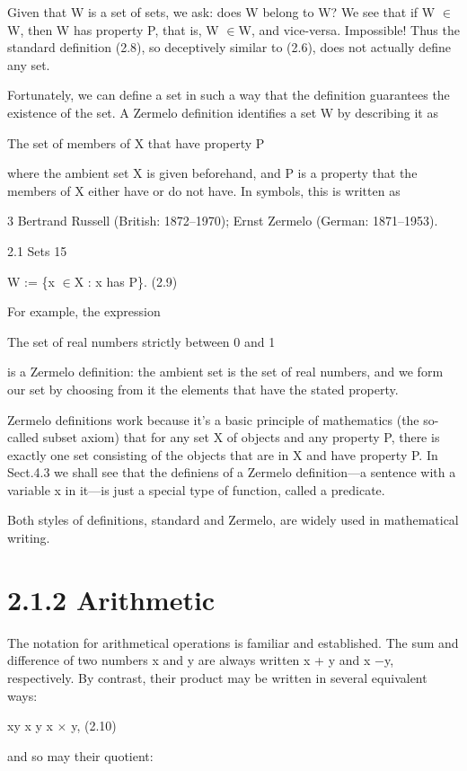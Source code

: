 \documentclass[11pt]{article}
\theoremstyle{plain}
\theoremstyle{definition}
\begin{document}
Given that W is a set of sets, we ask: does W belong to W? We see that if W $\in$W, then W has property P, that is, W $\in$W, and vice-versa. Impossible! Thus the standard definition (2.8), so deceptively similar to (2.6), does not actually define any set.

Fortunately, we can define a set in such a way that the definition guarantees the existence of the set. A Zermelo definition identifies a set W by describing it as

The set of members of X that have property P

where the ambient set X is given beforehand, and P is a property that the members of X either have or do not have. In symbols, this is written as

3 Bertrand Russell (British: 1872--1970); Ernst Zermelo (German: 1871--1953).

2.1 Sets 15

W := \{x $\in$X : x has P\}. (2.9)

For example, the expression

The set of real numbers strictly between 0 and 1

is a Zermelo definition: the ambient set is the set of real numbers, and we form our set by choosing from it the elements that have the stated property.

Zermelo definitions work because it's a basic principle of mathematics (the so-called subset axiom) that for any set X of objects and any property P, there is exactly one set consisting of the objects that are in X and have property P. In Sect.4.3 we shall see that the definiens of a Zermelo definition---a sentence with a variable x in it---is just a special type of function, called a predicate.

Both styles of definitions, standard and Zermelo, are widely used in mathematical writing.

\section{2.1.2 Arithmetic}

The notation for arithmetical operations is familiar and established. The sum and difference of two numbers x and y are always written x + y and x $-$y, respectively. By contrast, their product may be written in several equivalent ways:

xy x \textperiodcentered{} y x $\times$ y, (2.10)

and so may their quotient:
\end{document}
